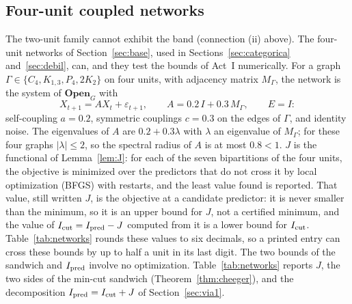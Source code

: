 \subsection{Four-unit coupled networks}\label{sec:networks}
The two-unit family cannot exhibit the band (connection (ii) above). The four-unit networks of Section~\ref{sec:base}, used in Sections~\ref{sec:categorica} and~\ref{sec:debil}, can, and they test the bounds of Act~I numerically. For a graph $\Gamma\in\{C_4,K_{1,3},P_4,2K_2\}$ on four units, with adjacency matrix $M_\Gamma$, the network is the system of $\mathbf{Open}_G$ with
\[
X_{t+1}=AX_t+\varepsilon_{t+1},\qquad A=0.2\,I+0.3\,M_\Gamma,\qquad E=I:
\]
self-coupling $a=0.2$, symmetric couplings $c=0.3$ on the edges of $\Gamma$, and identity noise. The eigenvalues of $A$ are $0.2+0.3\lambda$ with $\lambda$ an eigenvalue of $M_\Gamma$; for these four graphs $|\lambda|\le2$, so the spectral radius of $A$ is at most $0.8<1$. $J$ is the functional of Lemma~\ref{lem:J}: for each of the seven bipartitions of the four units, the objective is minimized over the predictors that do not cross it by local optimization (BFGS) with restarts, and the least value found is reported. That value, still written $J$, is the objective at a candidate predictor: it is never smaller than the minimum, so it is an upper bound for $J$, not a certified minimum, and the value of $I_{\rm cut}=I_{\rm pred}-J$ computed from it is a lower bound for $I_{\rm cut}$. Table~\ref{tab:networks} rounds these values to six decimals, so a printed entry can cross these bounds by up to half a unit in its last digit. The two bounds of the sandwich and $I_{\rm pred}$ involve no optimization. Table~\ref{tab:networks} reports $J$, the two sides of the min-cut sandwich (Theorem~\ref{thm:cheeger}), and the decomposition $I_{\rm pred}=I_{\rm cut}+J$ of Section~\ref{sec:via1}.
